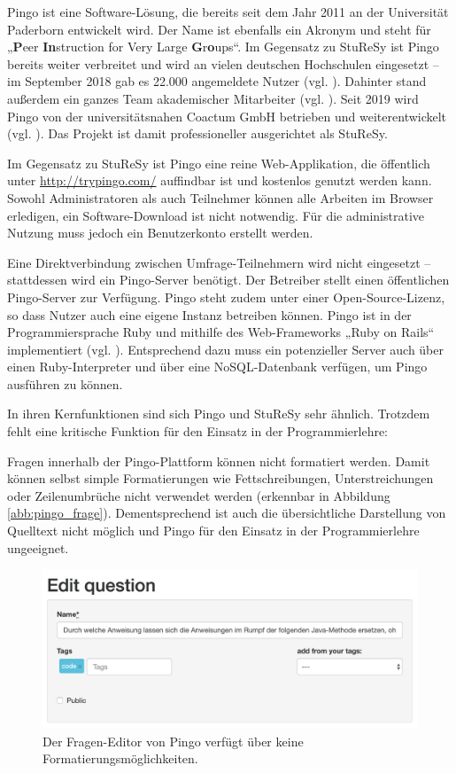 Pingo ist eine Software-Lösung, die bereits seit dem Jahr 2011 an der Universität Paderborn entwickelt wird. Der Name ist ebenfalls ein Akronym und steht für „\textbf{P}eer \textbf{In}struction for Very Large \textbf{G}r\textbf{o}ups“. Im Gegensatz zu StuReSy ist Pingo bereits weiter verbreitet und wird an vielen deutschen Hochschulen eingesetzt – im September 2018 gab es 22.000 angemeldete Nutzer (vgl. \cite{web:pingo_zukunft}). Dahinter stand außerdem ein ganzes Team akademischer Mitarbeiter (vgl. \cite{web:pingo_team}). Seit 2019 wird Pingo von der universitätsnahen Coactum GmbH betrieben und weiterentwickelt (vgl. \cite{web:pingo_coactum}). Das Projekt ist damit professioneller ausgerichtet als StuReSy.

Im Gegensatz zu StuReSy ist Pingo eine reine Web-Applikation, die öffentlich unter \url{http://trypingo.com/} auffindbar ist und kostenlos genutzt werden kann. Sowohl Administratoren als auch Teilnehmer können alle Arbeiten im Browser erledigen, ein Software-Download ist nicht notwendig. Für die administrative Nutzung muss jedoch ein Benutzerkonto erstellt werden. 

Eine Direktverbindung zwischen Umfrage-Teilnehmern wird nicht eingesetzt –  stattdessen wird ein Pingo-Server benötigt. Der Betreiber stellt einen öffentlichen Pingo-Server zur Verfügung. Pingo steht zudem unter einer Open-Source-Lizenz, so dass Nutzer auch eine eigene Instanz betreiben können. Pingo ist in der Programmiersprache Ruby und mithilfe des Web-Frameworks „Ruby on Rails“ implementiert (vgl. \cite{web:pingo_github}). Entsprechend dazu muss ein potenzieller Server auch über einen Ruby-Interpreter und über eine NoSQL-Datenbank verfügen, um Pingo ausführen zu können.

In ihren Kernfunktionen sind sich Pingo und StuReSy sehr ähnlich. Trotzdem fehlt eine kritische Funktion für den Einsatz in der Programmierlehre:

Fragen innerhalb der Pingo-Plattform können nicht formatiert werden. Damit können selbst simple Formatierungen wie Fettschreibungen, Unterstreichungen oder Zeilenumbrüche nicht verwendet werden (erkennbar in Abbildung \ref{abb:pingo_frage}). Dementsprechend ist auch die übersichtliche Darstellung von Quelltext nicht möglich und Pingo für den Einsatz in der Programmierlehre ungeeignet.


\begin{figure}[H]
    \includegraphics[width=12cm]{chapter/bewertung/bilder/pingo_editor.png}
    \centering
    \caption[Fragen-Editor in Pingo ohne Formatierungsmöglichkeiten]{Der Fragen-Editor von Pingo verfügt über keine Formatierungsmöglichkeiten.}
    \label{abb:pingo_editor}
\end{figure}


